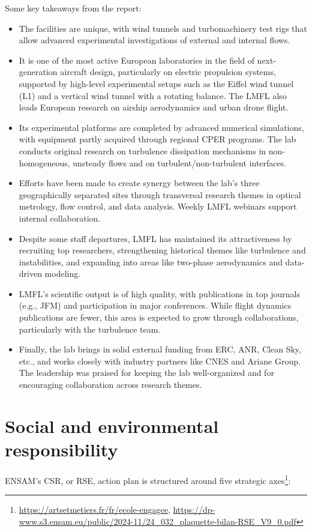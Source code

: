 Some key takeaways from the report:

\begin{itemize}
    \item The facilities are unique, with wind tunnels and turbomachinery test rigs that allow advanced experimental investigations of external and internal flows.
    \item It is one of the most active European laboratories in the field of next-generation aircraft design, particularly on electric propulsion systems, supported by high-level experimental setups such as the Eiffel wind tunnel (L1) and a vertical wind tunnel with a rotating balance. The LMFL also leads European research on airship aerodynamics and urban drone flight.
    \item Its experimental platforms are completed by advanced numerical simulations, with equipment partly acquired through regional \ac{CPER} programs. The lab conducts original research on turbulence dissipation mechanisms in non-homogeneous, unsteady flows and on turbulent/non-turbulent interfaces.    
    \item Efforts have been made to create synergy between the lab's three geographically separated sites through transversal research themes in optical metrology, flow control, and data analysis. Weekly LMFL webinars support internal collaboration.
    \item Despite some staff departures, LMFL has maintained its attractiveness by recruiting top researchers, strengthening historical themes like turbulence and instabilities, and expanding into areas like two-phase aerodynamics and data-driven modeling.
    \item LMFL's scientific output is of high quality, with publications in top journals (e.g., \ac{JFM}) and participation in major conferences. While flight dynamics publications are fewer, this area is expected to grow through collaborations, particularly with the turbulence team.
    \item Finally, the lab brings in solid external funding from ERC, ANR, Clean Sky, etc., and works closely with industry partners like CNES and Ariane Group. The leadership was praised for keeping the lab well-organized and for encouraging collaboration across research themes.
\end{itemize}


\section{Social and environmental responsibility} %
ENSAM's \ac{CSR}, or \ac{RSE}, action plan is structured around five strategic axes\footnote{\url{https://artsetmetiers.fr/fr/ecole-engagee}, \url{https://dp-www.s3.ensam.eu/public/2024-11/24_032_plaquette-bilan-RSE_V9_0.pdf}}:

